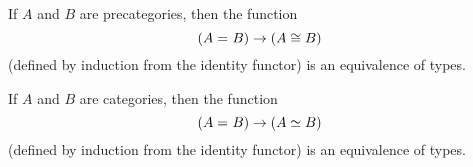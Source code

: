 \documentclass[hott-all.tex]{subfiles}
\begin{document}
\begin{lem}\label{ct:cat-eq-iso}
  If $A$ and $B$ are precategories, then the function
  \[(A =_{} B) \to (A\cong B)\]
  (defined by induction from the identity functor) is an equivalence of types.
\end{lem}
%

\begin{thm}\label{ct:cat-2cat}
  If $A$ and $B$ are categories, then the function
  \[(A =_{} B) \to (A \simeq B)\]
  (defined by induction from the identity functor) is an equivalence of types.
\end{thm}
%
%
\end{document}
